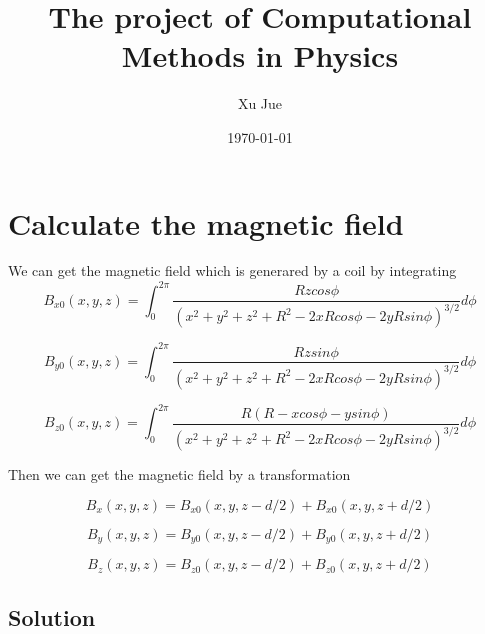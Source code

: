 \documentclass[12pt]{article}
\begin{document}
\title{The project of Computational Methods in Physics}
\author{Xu Jue}
\date{\today}
\maketitle

\section{Calculate the magnetic field }

\indent

We can get the magnetic field which is generared by a coil by integrating
\begin{equation}
    B_{x0}(x,y,z)=\int_0^{2 \pi} \frac{Rzcos \phi}{(x^2+y^2+z^2+R^2-2xRcos \phi-2yRsin \phi)^{3/2}} d\phi
  \label{}
\end{equation}

\begin{equation}
    B_{y0}(x,y,z)=\int_0^{2 \pi} \frac{Rzsin \phi}{(x^2+y^2+z^2+R^2-2xRcos \phi-2yRsin \phi)^{3/2}} d\phi
  \label{}
\end{equation}

\begin{equation}
    B_{z0}(x,y,z)=\int_0^{2 \pi} \frac{R(R-xcos\phi-ysin\phi)}{(x^2+y^2+z^2+R^2-2xRcos \phi-2yRsin \phi)^{3/2}} d\phi
  \label{}
\end{equation}

 Then we can get the magnetic field by a transformation

 \begin{equation}
     B_{x}(x,y,z)=B_{x0}(x,y,z-d/2)+B_{x0}(x,y,z+d/2)
   \label{}
 \end{equation}

 \begin{equation}
     B_{y}(x,y,z)=B_{y0}(x,y,z-d/2)+B_{y0}(x,y,z+d/2)
   \label{}
 \end{equation}

 \begin{equation}
     B_{z}(x,y,z)=B_{z0}(x,y,z-d/2)+B_{z0}(x,y,z+d/2)
   \label{}
 \end{equation}
\subsection{Solution}
\end{document}
